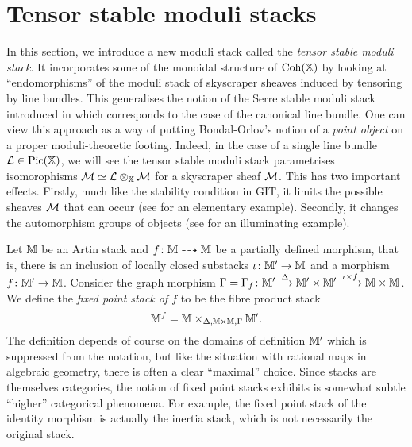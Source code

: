 \documentclass[12pt]{amsart}
\begin{document}
\section{Tensor stable moduli stacks} \label{sc:equaliserstack}

In this section, we introduce a new moduli stack called the {\em tensor stable moduli stack}. It incorporates some of the monoidal structure of $\operatorname{Coh}(\mathbb{X})$ by looking at ``endomorphisms'' of the moduli stack of skyscraper sheaves induced by tensoring by line bundles. This generalises the notion of the Serre stable moduli stack introduced in \cite{CL} which corresponds to the case of the canonical line bundle. One can view this approach as a way of putting Bondal-Orlov's notion \cite{BO} of a {\em point object} on a proper moduli-theoretic footing. Indeed, in the case of a single line bundle $\mathcal{L} \in \operatorname{Pic}(\mathbb{X})$, we will see the tensor stable moduli stack parametrises isomorophisms $\mathcal{M} \simeq \mathcal{L} \otimes_{\mathbb{X}} \mathcal{M}$ for a skyscraper sheaf $\mathcal{M}$. This has two important effects. Firstly, much like the stability condition in GIT, it limits the possible sheaves $\mathcal{M}$ that can occur (see \cite[Example~7.3]{CL} for an elementary example). Secondly, it changes the automorphism groups of objects (see \cite[Proposition~4.1(iii)]{CL} for an illuminating example).

Let $\mathbb{M}$ be an Artin stack and $f \colon \mathbb{M} \dashrightarrow \mathbb{M}$ be a partially defined morphism, that is, there is an inclusion of locally closed substacks $\iota \colon \mathbb{M}' \to \mathbb{M}$ and a morphism $f\colon \mathbb{M}' \to \mathbb{M}$. Consider the graph morphism $\Gamma = \Gamma_{f} \colon \mathbb{M}' \xrightarrow{\Delta} \mathbb{M}' \times \mathbb{M}' \xrightarrow{\iota \times f} \mathbb{M} \times \mathbb{M}$. We define the {\em fixed point stack of $f$} to be the fibre product stack
$$ \mathbb{M}^f = \mathbb{M} \times_{\Delta,\mathbb{M} \times \mathbb{M}, \Gamma} \mathbb{M}'.$$
The definition depends of course on the domains of definition $\mathbb{M}'$ which is suppressed from the notation, but like the situation with rational maps in algebraic geometry, there is often a clear ``maximal'' choice. Since stacks are themselves categories, the notion of fixed point stacks exhibits is somewhat subtle ``higher'' categorical phenomena. For example, the fixed point stack of the identity morphism is actually the inertia stack, which is not necessarily the original stack. 
\end{document}
